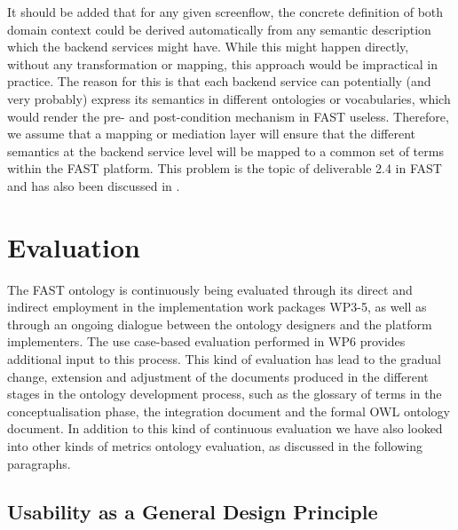 \documentclass[twoside]{fast_latex}
\begin{document}
\singlespacing
{}
\begin{figure}
	
\end{figure}
\doublespacing


It should be added that for any given screenflow, the concrete definition of both domain context could be derived automatically from any semantic description which the backend services might have. While this might happen directly, without any transformation or mapping, this approach would be impractical in practice. The reason for this is that each backend service can potentially (and very probably) express its semantics in different ontologies or vocabularies, which would render the pre- and post-condition mechanism in FAST useless. Therefore, we assume that a mapping or mediation layer will ensure that the different semantics at the backend service level will be mapped to a common set of terms within the FAST platform. This problem is the topic of deliverable 2.4 in FAST~\cite{ambrus2010fast_mediation} and has also been discussed in \cite{Ambrus:2009it}.


\clearpage
\section{Evaluation} %
\label{sec:evaluation}

The FAST ontology is continuously being evaluated through its direct and indirect employment in the implementation work packages WP3-5, as well as through an ongoing dialogue between the ontology designers and the platform implementers. The use case-based evaluation performed in WP6 provides additional input to this process. 
This kind of evaluation has lead to the gradual change, extension and adjustment of the documents produced in the different stages in the ontology development process, such as the glossary of terms in the conceptualisation phase, the integration document and the formal OWL ontology document. In addition to this kind of continuous evaluation we have also looked into other kinds of metrics ontology evaluation, as discussed in the following paragraphs.


\subsection{Usability as a General Design Principle} %
\label{sub:general_design_decisions}
\end{document}
